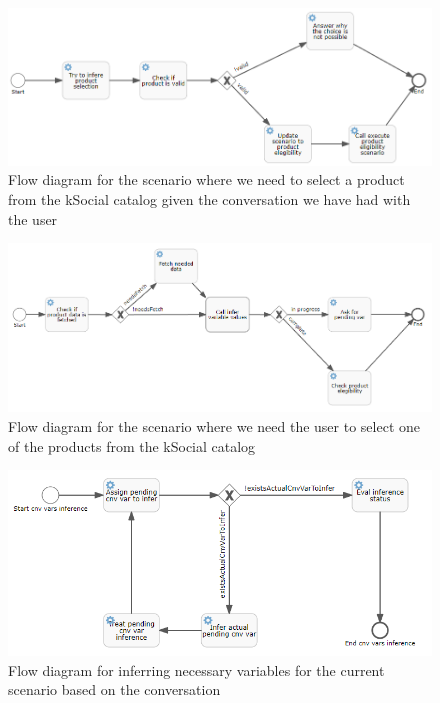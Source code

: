 \documentclass[a4paper,12pt,twoside]{ThesisStyle}
\begin{document}
\begin{figure}[htb]
  \centering
  \includegraphics[width=1\textwidth]{imatges/4_2_DsoExecuteProductSelectionScenario.png}
  \caption{Flow diagram for the scenario where we need to select a product from the kSocial catalog given the conversation we have had with the user}
\end{figure}

\begin{figure}[htb]
  \centering
  \includegraphics[width=1\textwidth]{imatges/4_3_DsoProductElegibilityScenario.png}
  \caption{Flow diagram for the scenario where we need the user to select one of the products from the kSocial catalog}
\end{figure}

\begin{figure}[htb]
  \centering
  \includegraphics[width=1\textwidth]{imatges/5_InferVariablesProcess.png}
  \caption{Flow diagram for inferring necessary variables for the current scenario based on the conversation}
\end{figure}
\end{document}
